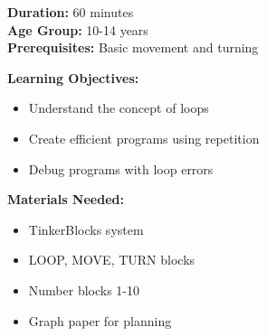 \textbf{Duration:} 60 minutes \\
\textbf{Age Group:} 10-14 years \\
\textbf{Prerequisites:} Basic movement and turning

\textbf{Learning Objectives:}
\begin{itemize}
    \item Understand the concept of loops
    \item Create efficient programs using repetition
    \item Debug programs with loop errors
\end{itemize}

\textbf{Materials Needed:}
\begin{itemize}
    \item TinkerBlocks system
    \item LOOP, MOVE, TURN blocks
    \item Number blocks 1-10
    \item Graph paper for planning
\end{itemize}

